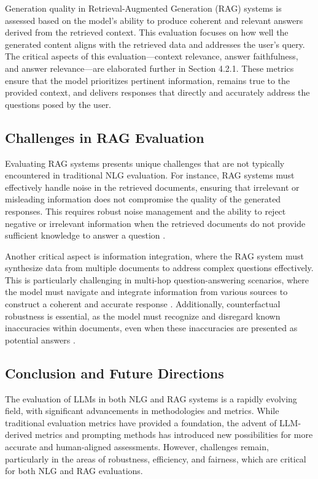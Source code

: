 Generation quality in Retrieval-Augmented Generation (RAG) systems is assessed based on the model’s ability to produce coherent and relevant answers derived from the retrieved context. This evaluation focuses on how well the generated content aligns with the retrieved data and addresses the user’s query. The critical aspects of this evaluation—context relevance, answer faithfulness, and answer relevance—are elaborated further in Section 4.2.1. These metrics ensure that the model prioritizes pertinent information, remains true to the provided context, and delivers responses that directly and accurately address the questions posed by the user.

\subsection{Challenges in RAG Evaluation}

Evaluating RAG systems presents unique challenges that are not typically encountered in traditional NLG evaluation. For instance, RAG systems must effectively handle noise in the retrieved documents, ensuring that irrelevant or misleading information does not compromise the quality of the generated responses. This requires robust noise management and the ability to reject negative or irrelevant information when the retrieved documents do not provide sufficient knowledge to answer a question \cite{gao2023retrieval}.

Another critical aspect is information integration, where the RAG system must synthesize data from multiple documents to address complex questions effectively. This is particularly challenging in multi-hop question-answering scenarios, where the model must navigate and integrate information from various sources to construct a coherent and accurate response \cite{luo2023divide}. Additionally, counterfactual robustness is essential, as the model must recognize and disregard known inaccuracies within documents, even when these inaccuracies are presented as potential answers \cite{lewis2020retrieval}.

\subsection{Conclusion and Future Directions}

The evaluation of LLMs in both NLG and RAG systems is a rapidly evolving field, with significant advancements in methodologies and metrics. While traditional evaluation metrics have provided a foundation, the advent of LLM-derived metrics and prompting methods has introduced new possibilities for more accurate and human-aligned assessments. However, challenges remain, particularly in the areas of robustness, efficiency, and fairness, which are critical for both NLG and RAG evaluations.

